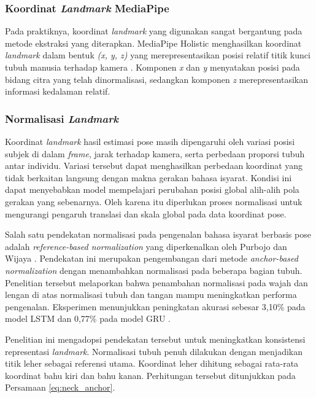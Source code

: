 \subsubsection{Koordinat \textit{Landmark} MediaPipe}
Pada praktiknya, koordinat \textit{landmark} yang digunakan sangat bergantung pada metode ekstraksi yang diterapkan.
MediaPipe Holistic menghasilkan koordinat \textit{landmark} dalam bentuk \textit{(x, y, z)} yang merepresentasikan posisi relatif titik kunci tubuh manusia terhadap kamera \cite{googlemediapipeholistic}.
Komponen \textit{x} dan \textit{y} menyatakan posisi pada bidang citra yang telah dinormalisasi, sedangkan komponen \textit{z} merepresentasikan informasi kedalaman relatif.

\subsubsection{Normalisasi \textit{Landmark}} \label{subsub:normalisasi-landmark}
Koordinat \textit{landmark} hasil estimasi pose masih dipengaruhi oleh variasi posisi subjek di dalam \textit{frame}, jarak terhadap kamera, serta perbedaan proporsi tubuh antar individu.
Variasi tersebut dapat menghasilkan perbedaan koordinat yang tidak berkaitan langsung dengan makna gerakan bahasa isyarat.
Kondisi ini dapat menyebabkan model mempelajari perubahan posisi global alih-alih pola gerakan yang sebenarnya.
Oleh karena itu diperlukan proses normalisasi untuk mengurangi pengaruh translasi dan skala global pada data koordinat pose.

Salah satu pendekatan normalisasi pada pengenalan bahasa isyarat berbasis pose adalah \textit{reference-based normalization} yang diperkenalkan oleh Purbojo dan Wijaya \cite{purbojo2025normalization}.
Pendekatan ini merupakan pengembangan dari metode \textit{anchor-based normalization} dengan menambahkan normalisasi pada beberapa bagian tubuh.
Penelitian tersebut melaporkan bahwa penambahan normalisasi pada wajah dan lengan di atas normalisasi tubuh dan tangan mampu meningkatkan performa pengenalan.
Eksperimen menunjukkan peningkatan akurasi sebesar 3,10\% pada model LSTM dan 0,77\% pada model GRU \cite{purbojo2025normalization}.

Penelitian ini mengadopsi pendekatan tersebut untuk meningkatkan konsistensi representasi \textit{landmark}.
Normalisasi tubuh penuh dilakukan dengan menjadikan titik leher sebagai referensi utama.
Koordinat leher dihitung sebagai rata-rata koordinat bahu kiri dan bahu kanan.
Perhitungan tersebut ditunjukkan pada Persamaan \ref{eq:neck_anchor}.


